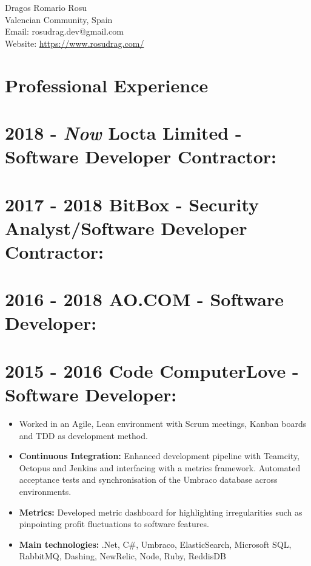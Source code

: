 \documentclass[12pt,a4paper]{res}
\begin{document}
\thispagestyle{empty}
  \begin{center}
  \Large{Dragos Romario Rosu  \\ [12pt]}
  \normalsize Valencian Community, Spain\\
  Email: rosudrag.dev@gmail.com\\
  Website: \url{https://www.rosudrag.com/}
  \end{center}
  
\begin{resume}
\vspace{-10mm}
\section{\large\bf Professional Experience}

\section{\bf 2018 - \textit{Now} \hspace{0.6mm} Locta Limited - Software Developer Contractor:}
\section{\bf 2017 - 2018 \hspace{0.3mm} BitBox - Security Analyst/Software Developer Contractor:}
\section{\bf 2016 - 2018 \hspace{0.3mm} AO.COM - Software Developer:}
\section{\bf 2015 - 2016 \hspace{0.3mm} Code ComputerLove - Software Developer:}
\vspace{5mm}    
	\begin{itemize}
	\item[] Worked in an Agile, Lean environment with Scrum meetings, Kanban boards and TDD as development method.
	\item \textbf{Continuous Integration:} Enhanced development pipeline with Teamcity, Octopus and Jenkins and interfacing with a metrics framework. Automated acceptance tests and synchronisation of the Umbraco database across environments.
	\item \textbf{Metrics:} Developed metric dashboard for highlighting irregularities such as pinpointing profit fluctuations to software features.
	\item \textbf{Main technologies:} .Net, C\#, Umbraco, ElasticSearch, Microsoft SQL, RabbitMQ, Dashing, NewRelic, Node, Ruby, ReddisDB
	\end{itemize}
	

\end{resume}
\end{document}
